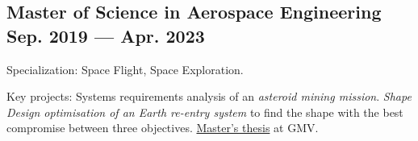 


\subsection{{Master of Science in Aerospace Engineering} \hfill Sep. 2019 --- Apr. 2023 }
\begin{zitemize}
\item Specialization: Space Flight, Space Exploration. %
\item Key projects: 
     Systems requirements analysis of an \textit{asteroid mining mission}. 
     \textit{Shape Design optimisation of an Earth re-entry system} to find the shape with the best compromise between three objectives. 
     \href{https://repository.tudelft.nl/islandora/object/uuid:f472201e-0e32-4b9e-8aa3-04521908396a}{Master's thesis} at GMV.

\end{zitemize}

